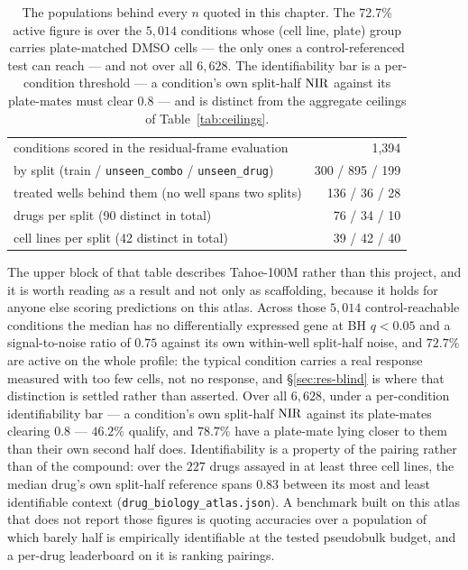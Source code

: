 \begin{table}[htbp]
\begin{tabular}{p{}r}
conditions scored in the residual-frame evaluation & 1,394 \\
\quad by split (train / \texttt{unseen\_combo} / \texttt{unseen\_drug}) & 300 / 895 / 199 \\
\quad treated wells behind them (no well spans two splits) & 136 / 36 / 28 \\
\quad drugs per split (90 distinct in total) & 76 / 34 / 10 \\
\quad cell lines per split (42 distinct in total) & 39 / 42 / 40 \\
\bottomrule
\end{tabular}
\caption{The populations behind every $n$ quoted in this chapter. The 72.7\% active figure is over
the $5{,}014$ conditions whose (cell line, plate) group carries plate-matched DMSO cells --- the
only ones a control-referenced test can reach --- and not over all $6{,}628$. The
identifiability bar is a per-condition threshold --- a condition's own split-half $\textrm{NIR}$ against
its plate-mates must clear $0.8$ --- and is distinct from the aggregate ceilings of Table~\ref{tab:ceilings}.}
\label{tab:scale}
\end{table}

The upper block of that table describes Tahoe-100M rather than this project, and it is worth reading
as a result and not only as scaffolding, because it holds for anyone else scoring predictions on
this atlas. Across those $5{,}014$ control-reachable conditions the median has no
differentially expressed gene at BH $q<0.05$ and a signal-to-noise ratio of $0.75$ against its own
within-well split-half noise, and $72.7\%$ are active on the whole profile: the typical condition
carries a real response measured with too few cells, not no response, and \S\ref{sec:res-blind} is
where that distinction is settled rather than asserted. Over all $6{,}628$, under a per-condition
identifiability bar --- a condition's own split-half $\textrm{NIR}$ against its plate-mates clearing $0.8$
--- $46.2\%$ qualify, and $78.7\%$ have a plate-mate lying closer to them than their own second half
does. Identifiability is a property of the pairing rather than of the compound: over the $227$ drugs
assayed in at least three cell lines, the median drug's own split-half reference spans $0.83$
between its most and least identifiable context (\texttt{drug\_biology\_atlas.json}). A benchmark
built on this atlas that does not report those figures is quoting accuracies over a population of
which barely half is empirically identifiable at the tested pseudobulk budget, and a per-drug
leaderboard on it is ranking pairings.

